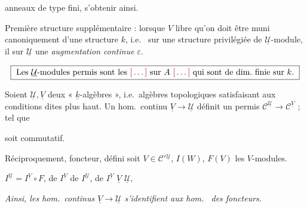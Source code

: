 \documentclass[11pt,a4paper]{article}
\begin{document}
\ill{} anneaux de \ill{} type fini, s'obtenir ainsi.

Première structure supplémentaire : lorsque \ill{} $V$ libre \struck{\ill{}}
\ill{} qu'on doit être muni canoniquement d'une structure $k$, i.e.\ \ill{} sur
\ill{} une structure privilégiée de $\underline{\mathcal{U}}$-module, \ill{} il
\ill{} \ill{} sur $\underline{\mathcal{U}}$ une \emph{augmentation continue}
$\varepsilon$.

\[ \boxed{\ \text{Les } \underline{\mathcal{U}}\text{-modules permis sont les }
   \ill{} \text{ sur } A \ \ill{} \text{ qui sont de dim.\ finie sur } k . \ } \]



Soient $\underline{\mathcal{U}}, \underline{V}$ deux \struck{\ill{}}
« $\underline{k}$-algèbres », i.e.\ algèbres topologiques \struck{\ill{}}
satisfaisant aux conditions dites plus haut. Un hom.\ continu
 $\underline{V} \to \underline{\mathcal{U}}$
définit un \struck{\ill{}}  permis
$\mathcal{C}^{\underline{\mathcal{U}}} \to \mathcal{C}^{\underline{V}}$ ;
\struck{\ill{}} \ill{} tel que


soit commutatif.

Réciproquement, \add{\ill{}} \ill{} foncteur, défini \struck{\ill{}} soit
$V \in \mathcal{C}'{}^{\underline{\mathcal{U}}}$, \ill{} \ill{} $I(W)$,
\struck{\ill{}} \ill{} $F(V)$ \ill{} les $V$-modules. \ill{}


\ill{} $I^{\underline{\mathcal{U}}} = I^{\underline{V}} \circ F$, \ill{} de
$I^{\underline{V}}$ \ill{} de $I^{\underline{\mathcal{U}}}$, \ill{} de
$I^{\underline{V}}$ \ill{} $\underline{V}$ \ill{} $\underline{\mathcal{U}}$,
\ill{}

\emph{Ainsi, les hom.\ continus $\underline{V} \to \underline{\mathcal{U}}$
s'identifient aux hom.\  des foncteurs.}
\end{document}
